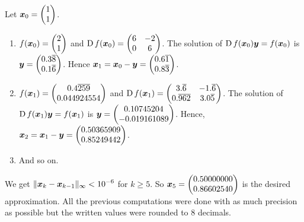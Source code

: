 \begin{egg}
Let $\displaystyle \bm{x}_0 = \begin{pmatrix} 1 \\ 1 \end{pmatrix}$.
\begin{enumerate}
\item $f(\bm{x}_0) = \begin{pmatrix} 2 \\ 1 \end{pmatrix}$ and
$\operatorname{D} f(\bm{x}_0) =  \begin{pmatrix} 6 & -2 \\ 0 & 6 \end{pmatrix}$.
The solution of $\operatorname{D} f(\bm{x}_0)\bm{y} = f(\bm{x}_0)$ is
$\displaystyle \bm{y} =  \begin{pmatrix} 0.3\overline{8} \\
0.1\overline{6} \end{pmatrix}$.  Hence
$\displaystyle \bm{x}_1 = \bm{x}_0 - \bm{y} =
\begin{pmatrix} 0.6\overline{1} \\ 0.8\overline{3} \end{pmatrix}$.
\item $\displaystyle f(\bm{x}_1) = \begin{pmatrix} 0.4\overline{259}
\\ 0.044924554 \end{pmatrix}$ and
$\displaystyle \operatorname{D} f(\bm{x}_1) =
\begin{pmatrix} 3.\overline{6} & -1.\overline{6} \\
0.\overline{962} & 3.0\overline{5} \end{pmatrix}$.
The solution of $\operatorname{D} f(\bm{x}_1)\bm{y} = f(\bm{x}_1)$ is
$\displaystyle \bm{y} = \begin{pmatrix} 0.10745204 \\ -0.019161089
\end{pmatrix}$.
Hence, $\displaystyle \bm{x}_2 = \bm{x}_1 - \bm{y} =
\begin{pmatrix} 0.50365909 \\ 0.85249442 \end{pmatrix}$.
\item And so on.
\end{enumerate}
We get
$\displaystyle \|\bm{x}_k - \bm{x}_{k-1}\|_\infty < 10^{-6}$ for $k\geq 5$.
So $\displaystyle \bm{x}_5 = \begin{pmatrix} 0.50000000 \\
0.86602540 \end{pmatrix}$
is the desired approximation.  All the previous computations were done
with as much precision as possible but the written values were rounded
to $8$ decimals.
\end{egg}

